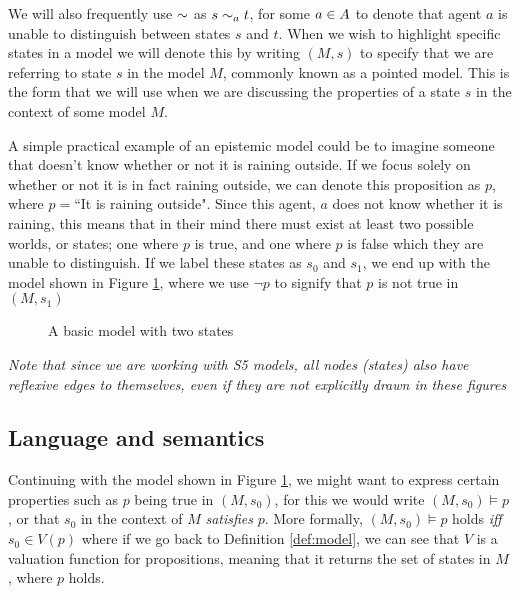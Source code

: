 We will also frequently use $\sim$ as $s\sim_a t$, for some $a\in A$ to denote that agent $a$ is unable to distinguish between states $s$ and $t$. When we wish to highlight specific states in a model we will denote this by writing $(M,s)$ to specify that we are referring to state $s$ in the model $M$, commonly known as a pointed model. This is the form that we will use when we are discussing the properties of a state $s$ in the context of some model $M$. 

A simple practical example of an epistemic model could be to imagine someone that doesn't know whether or not it is raining outside. If we focus solely on whether or not it is in fact raining outside, we can denote this proposition as $p$, where $p = $``It is raining outside". Since this agent, $a$ does not know whether it is raining, this means that in their mind there must exist at least two possible worlds, or states; one where $p$ is true, and one where $p$ is false which they are unable to distinguish. If we label these states as $s_0$ and $s_1$, we end up with the model shown in Figure \ref{fig:basicEM}, where we use $\neg p$ to signify that $p$ is not true in $(M,s_1)$

\begin{figure}[h]
	\centering
	\caption{A basic model with two states}
	\label{fig:basicEM}
\end{figure}

\textit{Note that since we are working with S5 models, all nodes (states) also have reflexive edges to themselves, even if they are not explicitly drawn in these figures}

\subsection{Language and semantics}

Continuing with the model shown in Figure \ref{fig:basicEM}, we might want to express certain properties such as $p$ being true in $(M,s_0)$, for this we would write $(M,s_0) \models p$, or that $s_0$ in the context of $M$ \textit{satisfies} $p$. More formally, $(M,s_0) \models p$ holds \textit{iff} $s_0 \in V(p)$ where if we go back to Definition \ref{def:model}, we can see that $V$ is a valuation function for propositions, meaning that it returns the set of states in $M$, where $p$ holds. 

